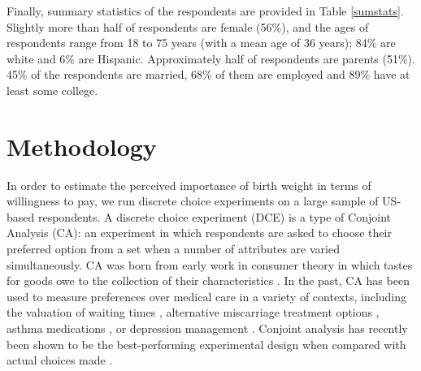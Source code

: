 \documentclass[a4paper, 11pt]{article}
\begin{document}
\begin{spacing}{1.4}
Finally, summary statistics of the respondents are provided in Table
\ref{sumstats}.  Slightly more than half of respondents are female (56\%),
and the ages of respondents range from 18 to 75 years (with a mean age of 36
years); 84\% are white and 6\% are Hispanic. Approximately half of respondents are parents (51\%). 45\% of the
respondents are married, 68\% of them are employed and 89\% have at least some college.


\section{Methodology}
\label{scn:methods}
In order to estimate the perceived importance of birth weight in terms of willingness
to pay, we run discrete choice experiments on a
large sample of US-based respondents. A discrete choice experiment (DCE) is a type of Conjoint Analysis (CA):
an experiment in which respondents are asked to choose their preferred option
from a set when a number of attributes are varied simultaneously.
CA was born from early work in consumer theory in which tastes for goods owe
to the collection of their characteristics \citep{Lancaster1966}.  In the
past, CA has been used to measure preferences over medical care in a variety of
contexts, including the valuation of waiting times \citep{Propper1990,Propper1995},
alternative miscarriage treatment options \citep{RyanHughes1997}, asthma
medications \citep{Kingetal2007}, or depression management \citep{Wittinketal2010}.
Conjoint analysis has recently been shown to be the best-performing experimental
design when compared with actual choices made \citep{Hainmuelleretal2015}.



\end{spacing}
\end{document}
